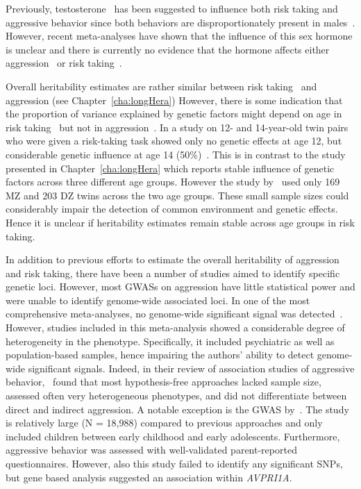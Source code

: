 Previously, testosterone~\cite{Vermeersch2008} has been suggested to influence both risk taking and aggressive behavior since both behaviors are disproportionately present in males~\cite{Byrnes1999}.
However, recent meta-analyses have shown that  the influence of this sex hormone is unclear and there is currently no evidence that the hormone affects either aggression~\cite{Archer2005a} or risk taking~\cite{Vermeersch2008}.

Overall heritability estimates are rather similar between risk taking~\cite{Anokhin2009} and aggression (see Chapter~\ref{cha:longHera})
However, there is some indication that the proportion of variance explained by genetic factors might depend on age in risk taking~\cite{Anokhin2009} but not in aggression~\cite{Porsch2016}.
In a study on 12- and 14-year-old twin pairs who were given a risk-taking task showed only no genetic effects at age 12, but considerable genetic influence at age 14 (50\%)~\cite{Anokhin2009}.
This is in contrast to the study presented in Chapter~\ref{cha:longHera} which reports stable influence of genetic factors across three different age groups.
However the study by~\citet{Anokhin2009} used only 169 MZ and 203 DZ twins across the two age groups.
These small sample sizes could considerably impair the detection of common environment and genetic effects. 
Hence it is unclear if heritability estimates remain stable across age groups in risk taking.

In addition to previous efforts to estimate the overall heritability of aggression and risk taking, there have been a number of studies aimed to identify specific genetic loci.
However, most GWASs on aggression have little statistical power and were unable to identify genome-wide associated loci.
In one of the most comprehensive meta-analyses, no genome-wide significant signal was detected~\citet{Vassos2014}.
However, studies included in this meta-analysis showed a considerable degree of heterogeneity in the phenotype.
Specifically, it included psychiatric as well as population-based samples, hence impairing the authors' ability to detect genome-wide significant signals.
Indeed, in their review of association studies of aggressive behavior,~\citet{Fernandez-Castillo2016} found that most hypothesis-free approaches lacked sample size, assessed often very heterogeneous phenotypes, and did not differentiate between direct and indirect aggression. 
A notable exception is the GWAS by~\citet{Pappa2016a}.
The study is relatively large (N = 18,988) compared to previous approaches and only included children between early childhood and early adolescents.
Furthermore, aggressive behavior was assessed with well-validated parent-reported questionnaires. 
However, also this study failed to identify any significant SNPs, but gene based analysis suggested an association within \textit{AVPRI1A}.

